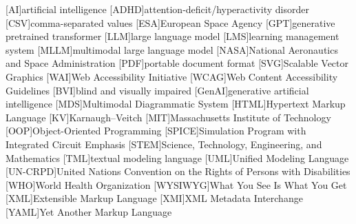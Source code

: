 
[AI]{artificial intelligence}
[ADHD]{attention-deficit/hyperactivity disorder}
[CSV]{comma-separated values}
[ESA]{European Space Agency}
[GPT]{generative pretrained transformer}
[LLM]{large language model}
[LMS]{learning management system}
[MLLM]{multimodal large language model}
[NASA]{National Aeronautics and Space Administration}
[PDF]{portable document format}
[SVG]{Scalable Vector Graphics}
[WAI]{Web Accessibility Initiative}
[WCAG]{Web Content Accessibility Guidelines}
[BVI]{blind and visually impaired}
[GenAI]{generative artificial intelligence}
[MDS]{Multimodal Diagrammatic System}
[HTML]{Hypertext Markup Language}
[KV]{Karnaugh--Veitch}
[MIT]{Massachusetts Institute of Technology}
[OOP]{Object-Oriented Programming}
[SPICE]{Simulation Program with Integrated Circuit Emphasis}
[STEM]{Science, Technology, Engineering, and Mathematics}
[TML]{textual modeling language}
[UML]{Unified Modeling Language}
[UN-CRPD]{United Nations Convention on the Rights of Persons with Disabilities}
[WHO]{World Health Organization}
[WYSIWYG]{What You See Is What You Get}
[XML]{Extensible Markup Language}
[XMI]{XML Metadata Interchange}
[YAML]{Yet Another Markup Language}
